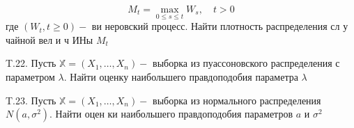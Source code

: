 \documentclass[a4paper,12pt]{article} %
\begin{document}
\begin{example}

$$
M_{t}=\max _{0 \leq s \leq t} W_{s}, \quad t>0
$$
где $\left(W_{t}, t \geq 0\right)-$ ви неровский процесс. Найти плотность распределения сл у чайной вел и ч ИНы $M_{t}$




\end{example}



\begin{example}

T.22. Пусть $\mathbb{X}=\left(X_{1}, \ldots, X_{n}\right)-$ выборка из пуассоновского распределения
с параметром $\lambda .$ Найти оценку наибольшего правдоподобия параметра
$\lambda$




\end{example}



\begin{example}

T.23. Пусть $\mathbb{X}=\left(X_{1}, \ldots, X_{n}\right)-$ выборка из нормального распределения $N\left(a, \sigma^{2}\right) .$ Найти оцен ки наибольшего правдоподобия параметров $a$ и $\sigma^{2}$




\end{example}






\printindex



\end{document}
